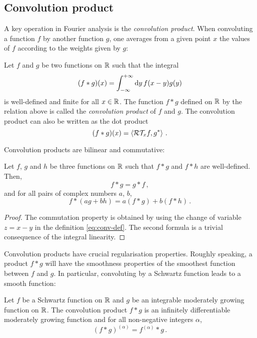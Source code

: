 \subsection{Convolution product}
A key operation in Fourier analysis is the \emph{convolution product}. When convoluting a
function $f$ by another function $g$, one averages from a given point $x$ the values of
$f$ according to the weights given by $g$:
\begin{definition}
  Let $f$ and $g$ be two functions on $\mathbb{R}$ such that the integral
  \begin{equation}
    (f\ast g)(x)=\int_{-\infty}^{+\infty}\mathrm{d}{y}\,f(x-y)g(y)\label{eq:conv-def}
  \end{equation}
  is well-defined and finite for all $x\in\mathbb{R}$. The function $f\ast g$ defined on $\mathbb{R}$ by
  the relation above is called the \emph{convolution product} of $f$ and $g$. The
  convolution product can also be written as the dot product
  \begin{equation}
    (f\ast g)(x)=\braket{\mathcal{R}\mathcal{T}_xf,g^*}\,.
  \end{equation}
\end{definition}
Convolution products are bilinear and commutative:
\begin{proposition}
  Let $f$, $g$ and $h$ be three functions on $\mathbb{R}$ such that $f\ast g$ and $f\ast h$ are
  well-defined. Then,
  \begin{equation}
    f\ast g=g\ast f\,,
  \end{equation}
  and for all pairs of complex numbers $a$, $b$,
  \begin{equation}
    f\ast (ag+bh)=a(f\ast g) + b(f\ast h)\,.
  \end{equation}
\end{proposition}
\begin{proof}
  The commutation property is obtained by using the change of variable $z=x-y$ in the
  definition \cref{eq:conv-def}. The second formula is a trivial consequence of the
  integral linearity.
\end{proof}
Convolution products have crucial regularisation properties. Roughly speaking, a product
$f\ast g$ will have the smoothness properties of the smoothest function between $f$ and
$g$. In particular, convoluting by a Schwartz function leads to a smooth function:
\begin{theorem}
  Let $f$ be a Schwartz function on $\mathbb{R}$ and $g$ be an integrable moderately growing
  function on $\mathbb{R}$. The convolution product $f\ast g$ is an infinitely differentiable
  moderately growing function and for all non-negative integers $\alpha$,
  \begin{equation}
    (f\ast g)^{(\alpha)}=f^{(\alpha)}\ast g\,.
  \end{equation}
\end{theorem}
